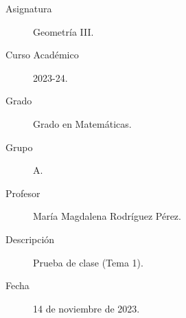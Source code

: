 \documentclass[12pt]{article}
\begin{document}

    
    

    
    \begin{description}
        \item[Asignatura] Geometría III.
        \item[Curso Académico] 2023-24.
        \item[Grado] Grado en Matemáticas.
        \item[Grupo] A.
        \item[Profesor] María Magdalena Rodríguez Pérez.
        \item[Descripción] Prueba de clase (Tema 1).
        \item[Fecha] 14 de noviembre de 2023.
    
    \end{description}
    \newpage
\end{document}
